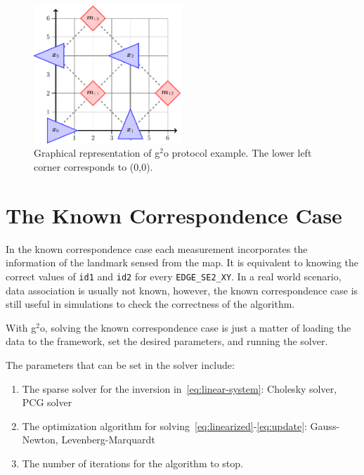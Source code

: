 \begin{figure}[htbp!]
    \centering
    \includegraphics[width=0.5\textwidth]{tikz/protocol-example.pdf}
    \caption[Graphical representation of g$^2$o protocol example.]{Graphical representation of g$^2$o protocol example. The lower left corner corresponds to (0,0).}
    \label{fig:protocol-example}
\end{figure}

\section{The Known Correspondence Case}
\label{sec:known-asso-imp}

In the known correspondence case each measurement incorporates the information of the landmark sensed from the map. It is equivalent to knowing the correct values of \texttt{id1} and \texttt{id2} for every \texttt{EDGE\_SE2\_XY}. In a real world scenario, data association is usually not known, however, the known correspondence case is still useful in simulations to check the correctness of the algorithm.

With g$^2$o, solving the known correspondence case is just a matter of loading the data to the framework, set the desired parameters, and running the solver. 

The parameters that can be set in the solver include: 

\begin{enumerate}
    \item The sparse solver for the inversion in~\eqref{eq:linear-system}: Cholesky solver, PCG solver
    \item The optimization algorithm for solving~\eqref{eq:linearized}-\eqref{eq:update}: Gauss-Newton, Levenberg-Marquardt
    \item The number of iterations for the algorithm to stop.
\end{enumerate}

